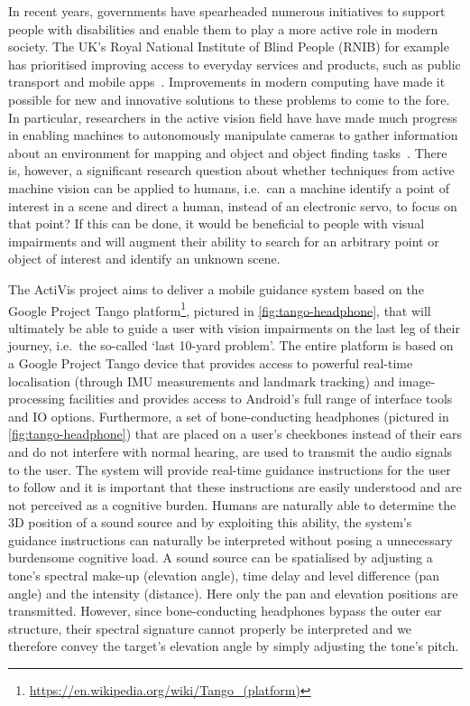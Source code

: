 \documentclass{llncs}
\begin{document}
In recent years, governments have spearheaded numerous initiatives to support people with disabilities and enable them to play a more active role in modern society.
The UK's Royal National Institute of Blind People (RNIB) for example has prioritised improving access to everyday services and products, such as public transport and mobile apps~\cite{rnib2016uk}.
Improvements in modern computing have made it possible for new and innovative solutions to these problems to come to the fore.
In particular, researchers in the active vision field have have made much progress in enabling machines to autonomously manipulate cameras to gather information about an environment for mapping and object and object finding tasks~\cite{bajcsy2018revisiting}.
There is, however, a significant research question about whether techniques from active machine vision can be applied to humans, i.e.\ can a machine identify a point of interest in a scene and direct a human, instead of an electronic servo, to focus on that point?
If this can be done, it would be beneficial to people with visual impairments and will augment their ability to search for an arbitrary point or object of interest and identify an unknown scene. 

The ActiVis project aims to deliver a mobile guidance system based on the Google Project Tango platform\footnote{\url{https://en.wikipedia.org/wiki/Tango\_(platform)}}, pictured in \cref{fig:tango-headphone}, that will ultimately be able to guide a user with vision impairments on the last leg of their journey, i.e.\ the so-called `last 10-yard problem'. 
The entire platform is based on a Google Project Tango device that provides access to powerful real-time localisation (through IMU measurements and landmark tracking) and image-processing facilities and provides access to Android's full range of interface tools and IO options. 
Furthermore, a set of bone-conducting headphones (pictured in \cref{fig:tango-headphone}) that are placed on a user's cheekbones instead of their ears and do not interfere with normal hearing, are used to transmit the audio signals to the user.
The system will provide real-time guidance instructions for the user to follow and it is important that these instructions are easily understood and are not perceived as a cognitive burden. 
Humans are naturally able to determine the 3D position of a sound source and by exploiting this ability, the system's guidance instructions can naturally be interpreted without posing a unnecessary burdensome cognitive load.
A sound source can be spatialised by adjusting a tone's spectral make-up (elevation angle), time delay and level difference (pan angle) and the intensity (distance).
Here only the pan and elevation positions are transmitted.
However, since bone-conducting headphones bypass the outer ear structure, their spectral signature cannot properly be interpreted and we therefore convey the target's elevation angle by simply adjusting the tone's pitch.
\end{document}
